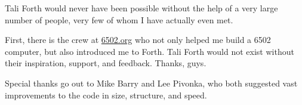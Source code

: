 Tali Forth would never have been possible without the help of a very large
number of people, very few of whom I have actually even met.

First, there is the crew at \href{http://6502.org}{6502.org} who
not only helped me build a 6502 computer, but also introduced me to Forth. Tali
Forth would not exist without their inspiration, support, and feedback. Thanks,
guys.

Special thanks go out to Mike Barry and Lee
Pivonka, who both suggested vast improvements to the code
in size, structure, and speed. 

